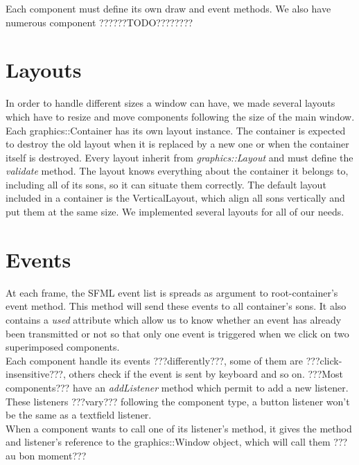 \documentclass{scrreprt}
\begin{document}
			Each component must define its own draw and event methods.
			We also have numerous component ??????TODO????????

		  \section{Layouts}
		  In order to handle different sizes a window can have, we made several layouts which have to resize and move components following the size of the main window. Each graphics::Container has its own layout instance. The container is expected to destroy the old layout when it is replaced by a new one or when the container itself is destroyed. Every layout inherit from \emph{graphics::Layout} and must define the \emph{validate} method. 
		  The layout knows everything about the container it belongs to, including all of its sons, so it can situate them correctly.
	The default layout included in a container is the VerticalLayout, which align all sons vertically and put them at the same size.
We implemented several layouts for all of our needs.

	\section{Events}
	At each frame, the SFML event list is spreads as argument to root-container's event method. This method will send these events to all container's sons. It also contains a \emph{used} attribute which allow us to know whether an event has already been transmitted or not so that only one event is triggered when we click on two superimposed components.\\

	Each component handle its events ???differently???, some of them are ???click-insensitive???, others check if the event is sent by keyboard and so on.
	???Most components??? have an \emph{addListener} method which permit to add a new listener. These listeners ???vary??? following the component type, a button listener won't be the same as a textfield listener.\\

	When a component wants to call one of its listener's method, it gives the method and listener's reference to the graphics::Window object, which will call them ???au bon moment???
\end{document}
